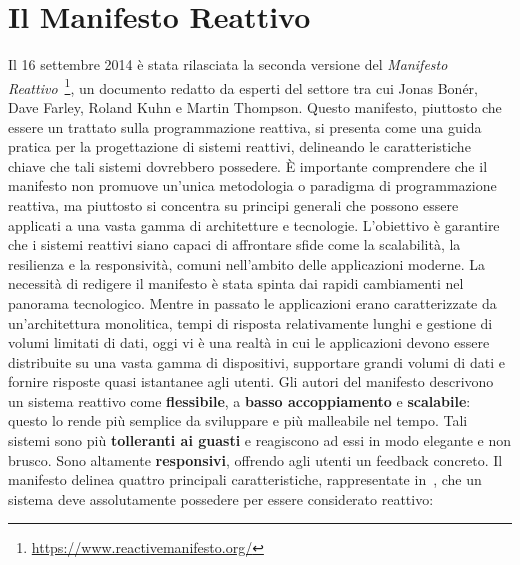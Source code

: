 \documentclass[12pt,a4paper,openright,twoside]{book}
\begin{document}
\section{Il Manifesto Reattivo}
Il 16 settembre 2014 è stata rilasciata la seconda versione del \textit{Manifesto Reattivo}~\footnote{\url{https://www.reactivemanifesto.org/}}, un documento redatto da esperti del settore tra cui Jonas Bonér, Dave Farley, Roland Kuhn e Martin Thompson. Questo manifesto, piuttosto che essere un trattato sulla programmazione reattiva, si presenta come una guida pratica per la progettazione di sistemi reattivi, delineando le caratteristiche chiave che tali sistemi dovrebbero possedere.
È importante comprendere che il manifesto non promuove un'unica metodologia o paradigma di programmazione reattiva, ma piuttosto si concentra su principi generali che possono essere applicati a una vasta gamma di architetture e tecnologie. L'obiettivo è garantire che i sistemi reattivi siano capaci di affrontare sfide come la scalabilità, la resilienza e la responsività, comuni nell'ambito delle applicazioni moderne.
La necessità di redigere il manifesto è stata spinta dai rapidi cambiamenti nel panorama tecnologico. Mentre in passato le applicazioni erano caratterizzate da un'architettura monolitica, tempi di risposta relativamente lunghi e gestione di volumi limitati di dati, oggi vi è una realtà in cui le applicazioni devono essere distribuite su una vasta gamma di dispositivi, supportare grandi volumi di dati e fornire risposte quasi istantanee agli utenti.
Gli autori del manifesto descrivono un sistema reattivo come \textbf{flessibile}, a \textbf{basso accoppiamento} e \textbf{scalabile}: questo lo rende più semplice da sviluppare e più malleabile nel tempo. Tali sistemi sono più \textbf{tolleranti ai guasti} e reagiscono ad essi in modo elegante e non brusco. Sono altamente \textbf{responsivi}, offrendo agli utenti un feedback concreto.
Il manifesto delinea quattro principali caratteristiche, rappresentate in~, che un sistema deve assolutamente possedere per essere considerato reattivo: 
\end{document}
